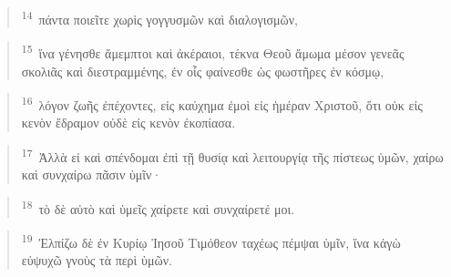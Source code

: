 \documentclass{article}
\newcommand{\currentverse}{1} %
\newcommand{\setcurrentverse}[1]{\renewcommand{\currentverse}{#1}}
\begin{document}
\begin{verse}

\setcurrentverse{14}

\setcounter{footnote}{0}

\textsuperscript{14}~πάντα ποιεῖτε χωρὶς γογγυσμῶν καὶ διαλογισμῶν,

\end{verse}

\begin{verse}

\setcurrentverse{15}

\setcounter{footnote}{0}

\textsuperscript{15}~ἵνα γένησθε ἄμεμπτοι καὶ ἀκέραιοι, τέκνα Θεοῦ ἄμωμα μέσον γενεᾶς σκολιᾶς καὶ διεστραμμένης, ἐν οἷς φαίνεσθε ὡς φωστῆρες ἐν κόσμῳ,

\end{verse}

\begin{verse}

\setcurrentverse{16}

\setcounter{footnote}{0}

\textsuperscript{16}~λόγον ζωῆς ἐπέχοντες, εἰς καύχημα ἐμοὶ εἰς ἡμέραν Χριστοῦ, ὅτι οὐκ εἰς κενὸν ἔδραμον οὐδὲ εἰς κενὸν ἐκοπίασα.

\end{verse}

\begin{verse}

\setcurrentverse{17}

\setcounter{footnote}{0}

\textsuperscript{17}~Ἀλλὰ εἰ καὶ σπένδομαι ἐπὶ τῇ θυσίᾳ καὶ λειτουργίᾳ τῆς πίστεως ὑμῶν, χαίρω καὶ συνχαίρω πᾶσιν ὑμῖν·

\end{verse}

\begin{verse}

\setcurrentverse{18}

\setcounter{footnote}{0}

\textsuperscript{18}~τὸ δὲ αὐτὸ καὶ ὑμεῖς χαίρετε καὶ συνχαίρετέ μοι.

\end{verse}

\begin{verse}

\setcurrentverse{19}

\setcounter{footnote}{0}

\textsuperscript{19}~Ἐλπίζω δὲ ἐν Κυρίῳ Ἰησοῦ Τιμόθεον ταχέως πέμψαι ὑμῖν, ἵνα κἀγὼ εὐψυχῶ γνοὺς τὰ περὶ ὑμῶν.

\end{verse}
\end{document}
